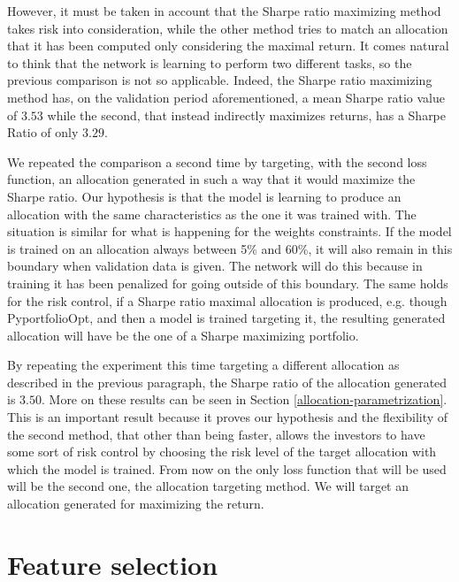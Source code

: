 \hfill \break

However, it must be taken in account that the Sharpe ratio maximizing method takes risk into  consideration, while the other method tries to match an allocation that it has been computed only considering the maximal return. It comes natural to think that the network is learning to perform two different tasks, so the previous comparison is not so applicable. Indeed, the Sharpe ratio maximizing method has, on the validation period aforementioned, a mean Sharpe ratio value of $3.53$ while the second, that instead indirectly maximizes returns, has a Sharpe Ratio of only $3.29$.  

\hfill \break
We repeated the comparison a second time by targeting, with the second loss function, an allocation generated in such a way that it would maximize the Sharpe ratio.
Our hypothesis is that the model is learning to produce an allocation with the same characteristics as the one it was trained with.
The situation is similar for what is happening for the weights constraints. If the model is trained on an allocation always between 5\% and 60\%, it will also remain in this boundary when validation data is given. The network will do this because in training it has been penalized for going outside of this boundary.
The same holds for the risk control, if a Sharpe ratio maximal allocation is produced, e.g. though PyportfolioOpt, and then a model is trained targeting it, the resulting generated allocation will have be the one of a Sharpe maximizing portfolio.

\hfill \break

By repeating the experiment this time targeting a different allocation as described in the previous paragraph, the Sharpe ratio of the allocation generated is $3.50$. More on these results can be seen in Section \ref{allocation-parametrization}.
This is an important result because it proves our hypothesis and the flexibility of the second method, that other than being faster, allows the investors to have some sort of risk control by choosing the risk level of the target allocation with which the model is trained. From now on the only loss function that will be used will be the second one, the allocation targeting method. We will target an allocation generated for maximizing the return.



\section{Feature selection}

